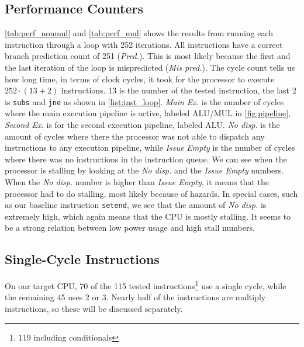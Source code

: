 \subsection{Performance Counters}
\autoref{tab:perf_nonmul} and \autoref{tab:perf_mul} shows the results from
running each instruction through a loop with 252 iterations. All instructions
have a  correct branch prediction count of 251 (\emph{Pred.}). This is most
likely because the first and the last iteration of the loop is mispredicted
(\emph{Mis pred.}). The cycle count tells us how long time, in terms of clock
cycles, it took for the processor to execute $252 \cdot (13+2)$ instructions. 13
is the number of the tested instruction, the last 2 is \texttt{subs} and
\texttt{jne} as shown in \autoref{list:inst_loop}. \emph{Main Ex.} is the number
of cycles where the main execution pipeline is active, labeled ALU/MUL in
\autoref{fig:pipeline}, \emph{Second Ex.} is for the second execution pipeline,
labeled ALU. \emph{No disp.} is the amount of cycles where there the processor
was not able to dispatch any instructions to any execution pipeline, while
\emph{Issue Empty} is the number of cycles where there was no instructions in
the instruction queue. We can see when the processor is stalling by looking at
the \emph{No disp.} and the \emph{Issue Empty} numbers. When the \emph{No disp.}
number is higher than \emph{Issue Empty}, it means that the processor had to do
stalling, most likely because of hazards. In special cases, such as our baseline
instruction \texttt{setend}, we see that the amount of \emph{No disp.} is
extremely high, which again means that the CPU is mostly stalling. It seems to
be a strong relation between low power usage and high stall numbers.


\subsection{Single-Cycle Instructions}
On our target CPU, 70 of the 115 tested instructions\footnote{119 including
conditionals} use a single cycle, while the remaining 45 uses 2 or 3.
Nearly half of the instructions are multiply instructions, so these will be
discussed separately.

